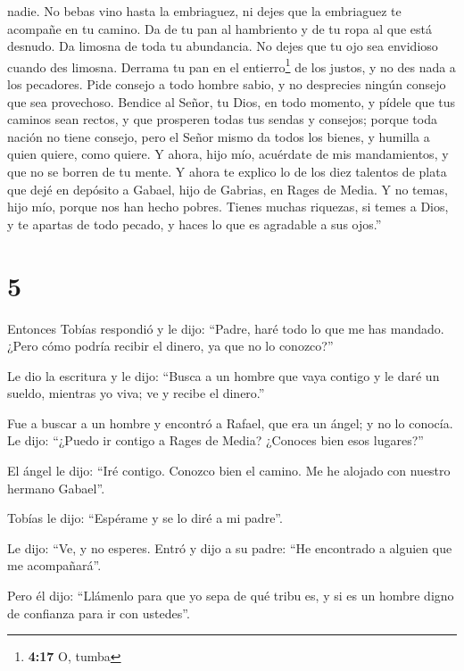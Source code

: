 nadie. No bebas vino hasta la embriaguez, ni dejes que la embriaguez te
acompañe en tu camino.  Da de tu pan al hambriento y de
tu ropa al que está desnudo. Da limosna de toda tu abundancia. No dejes
que tu ojo sea envidioso cuando des limosna.  Derrama tu
pan en el entierro\footnote{\textbf{4:17} O, tumba} de los justos, y no
des nada a los pecadores.  Pide consejo a todo hombre
sabio, y no desprecies ningún consejo que sea provechoso.
 Bendice al Señor, tu Dios, en todo momento, y pídele que
tus caminos sean rectos, y que prosperen todas tus sendas y consejos;
porque toda nación no tiene consejo, pero el Señor mismo da todos los
bienes, y humilla a quien quiere, como quiere. Y ahora, hijo mío,
acuérdate de mis mandamientos, y que no se borren de tu mente.
 Y ahora te explico lo de los diez talentos de plata que
dejé en depósito a Gabael, hijo de Gabrias, en Rages de Media.
 Y no temas, hijo mío, porque nos han hecho pobres.
Tienes muchas riquezas, si temes a Dios, y te apartas de todo pecado, y
haces lo que es agradable a sus ojos.''

\hypertarget{section-4}{%
\section{5}\label{section-4}}

 Entonces Tobías respondió y le dijo: ``Padre, haré todo
lo que me has mandado.  ¿Pero cómo podría recibir el
dinero, ya que no lo conozco?''

 Le dio la escritura y le dijo: ``Busca a un hombre que
vaya contigo y le daré un sueldo, mientras yo viva; ve y recibe el
dinero.''

 Fue a buscar a un hombre y encontró a Rafael, que era un
ángel;  y no lo conocía. Le dijo: ``¿Puedo ir contigo a
Rages de Media? ¿Conoces bien esos lugares?''

 El ángel le dijo: ``Iré contigo. Conozco bien el camino.
Me he alojado con nuestro hermano Gabael''.

 Tobías le dijo: ``Espérame y se lo diré a mi padre''.

 Le dijo: ``Ve, y no esperes. Entró y dijo a su padre:
``He encontrado a alguien que me acompañará''.

Pero él dijo: ``Llámenlo para que yo sepa de qué tribu es, y si es un
hombre digno de confianza para ir con ustedes''.

